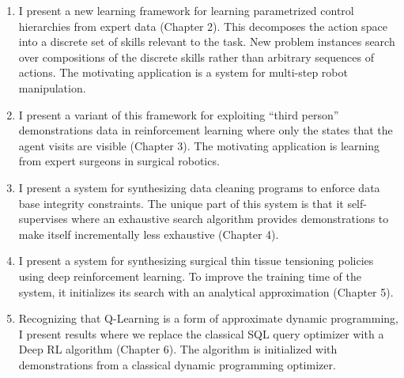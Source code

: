 \begin{enumerate}
    \item I present a new learning framework for learning parametrized control hierarchies from expert data (Chapter 2). This decomposes the action space into a discrete set of skills relevant to the task. New problem instances search over compositions of the discrete skills rather than arbitrary sequences of actions. The motivating application is a system for multi-step robot manipulation.
    
    \item I present a variant of this framework for exploiting ``third person'' demonstrations data in reinforcement learning where only the states that the agent visits are visible (Chapter 3). The motivating application is learning from expert surgeons in surgical robotics.
    
    \item I present a system for synthesizing data cleaning programs to enforce data base integrity constraints. The unique part of this system is that it self-supervises where an exhaustive search algorithm provides demonstrations to make itself incrementally less exhaustive (Chapter 4). 
    
    \item I present a system for synthesizing surgical thin tissue tensioning policies using deep reinforcement learning. To improve the training time of the system, it initializes its search with an analytical approximation (Chapter 5). 
    
    \item Recognizing that Q-Learning is a form of approximate dynamic programming, I present results where we replace the classical SQL query optimizer with a Deep RL algorithm (Chapter 6). The algorithm is initialized with demonstrations from a classical dynamic programming optimizer.
    
\end{enumerate}







